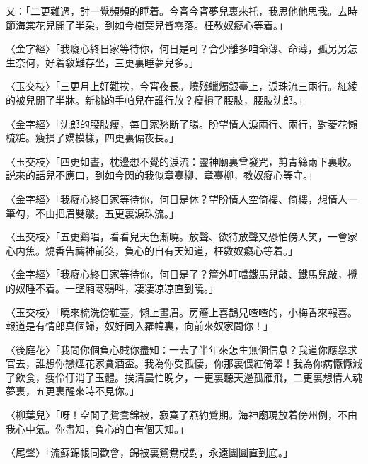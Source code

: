 又：「二更難過，討一覺頻頻的睡着。今宵今宵夢兒裏來托，我思他他思我。去時節海棠花兒開了半朶，到如今樹葉兒皆零落。枉敎奴癡心等着。」

〈金字經〉「我癡心終日家等待你，何日是可？合少離多咱命薄、命薄，孤另另怎生奈何，好着敎難存坐，三更裏睡夢兒多。」

〈玉交枝〉「三更月上好難挨，今宵夜長。燒殘蠟燭銀臺上，淚珠流三兩行。紅綾的被兒閒了半牀。新挑的手帕兒在誰行放？瘦損了腰肢，腰肢沈郎。」

〈金字經〉「沈郎的腰肢瘦，每日家愁断了腸。盼望情人淚兩行、兩行，對菱花懶梳粧。瘦損了嬌模樣，四更裏偏夜長。」

〈玉交枝〉「四更如晝，枕邊想不覺的淚流：靈神廟裏曾發咒，剪青絲兩下裏收。説來的話兒不應口，到如今閃的我似章臺柳、章臺柳，教奴癡心等守。」

〈金字經〉「我癡心終日家等待你，何日是休？望盼情人空倚樓、倚樓，想情人一筆勾，不由把眉雙皺。五更裏淚珠流。」　

〈玉交枝〉「五更鷄唱，看看兒天色漸曉。放聲、欲待放聲又恐怕傍人笑，一會家心内焦。燒香告禱神前筊，負心的自有天知道，枉敎奴癡心等着。」

〈金字經〉「我癡心終日家等待你，何日是了？簷外叮噹鐵馬兒敲、鐵馬兒敲，攪的奴睡不着。一壁廂寒鴉呌，凄凄凉凉直到曉。」

〈玉交枝〉「曉來梳洗傍粧臺，懶上畫眉。房簷上喜鵲兒喳喳的，小梅香來報喜。報道是有情郎真個歸，奴好同入羅幃裏，向前來奴家問你！」　

〈後庭花〉「我問你個負心賊你盡知：一去了半年來怎生無個信息？我道你應擧求官去，誰想你戀煙花家貪酒盃。我為你受孤悽，你那裏偎紅倚翠！我為你病懨懨減了飲食，瘦伶仃消了玉體。挨清晨怕晚夕，一更裏聽天邊孤雁飛，二更裏想情人魂夢裏，五更裏醒來時不見你。」

〈柳葉兒〉「呀！空閒了鴛鴦錦被，寂寞了燕約鶯期。海神廟現放着傍州例，不由我心中氣。你盡知，負心的自有個天知。」

〈尾聲〉「流蘇錦帳同歡會，錦被裏鴛鴦成對，永遠團圓直到底。」

